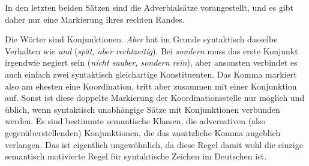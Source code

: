 In den letzten beiden Sätzen sind die Adverbialsätze vorangestellt, und es gibt daher nur eine Markierung ihres rechten Randes.

\label{sol:morphosyntaktischeschreibprinzipien03} Die Wörter sind Konjunktionen.
\textit{Aber} hat im Grunde syntaktisch dasselbe Verhalten wie \textit{und} (\textit{spät, aber rechtzeitig}).
Bei \textit{sondern} muss das erste Konjunkt irgendwie negiert sein (\textit{nicht sauber, sondern rein}), aber ansonsten verbindet es auch einfach zwei syntaktisch gleichartige Konstituenten.
Das Komma markiert also am ehesten eine Koordination, tritt aber zusammen mit einer Konjunktion auf.
Sonst ist diese doppelte Markierung der Koordinationsstelle nur möglich und üblich, wenn syntaktisch unabhängige Sätze mit Konjunktionen verbunden werden.
Es sind bestimmte semantische Klassen, \zB die adversativen (also gegenüberstellenden) Konjunktionen, die das zusätzliche Komma angeblich verlangen.
Das ist eigentlich ungewöhnlich, da diese Regel damit wohl die einzige semantisch motivierte Regel für syntaktische Zeichen im Deutschen ist.

